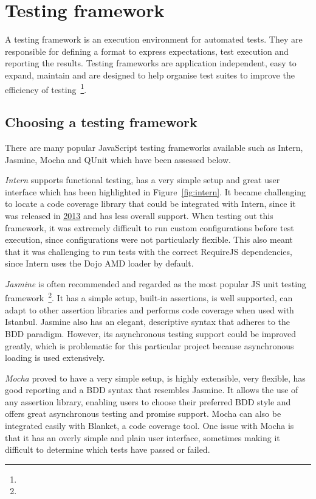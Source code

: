 \section{Testing framework} {
\label{sec:testing_framework}

	A testing framework is an execution environment for automated tests. They are responsible for defining a format to express expectations, test execution and reporting the results. Testing frameworks are application independent, easy to expand, maintain and are designed to help organise test suites to improve the efficiency of testing~\footnote{}.

	\subsection{Choosing a testing framework} {
	\label{sec:choosing_a_testing_framework}

		There are many popular JavaScript testing frameworks available such as Intern, Jasmine, Mocha and QUnit which have been assessed below.

		\emph{Intern} supports functional testing, has a very simple setup and great user interface which has been highlighted in Figure~\ref{fig:intern}. It became challenging to locate a code coverage library that could be integrated with Intern, since it was released in \href{https://github.com/theintern}{2013} and has less overall support. When testing out this framework, it was extremely difficult to run custom configurations before test execution, since configurations were not particularly flexible. This also meant that it was challenging to run tests with the correct RequireJS dependencies, since Intern uses the Dojo AMD loader by default.

		

		\emph{Jasmine} is often recommended and regarded as the most popular JS unit testing framework~\footnote{}. It has a simple setup, built-in assertions, is well supported, can adapt to other assertion libraries and performs code coverage when used with Istanbul. Jasmine also has an elegant, descriptive syntax that adheres to the BDD paradigm. However, its asynchronous testing support could be improved greatly, which is problematic for this particular project because asynchronous loading is used extensively.

		\emph{Mocha} proved to have a very simple setup, is highly extensible, very flexible, has good reporting and a BDD syntax that resembles Jasmine. It allows the use of any assertion library, enabling users to choose their preferred BDD style and offers great asynchronous testing and promise support. Mocha can also be integrated easily with Blanket, a code coverage tool. One issue with Mocha is that it has an overly simple and plain user interface, sometimes making it difficult to determine which tests have passed or failed.

}}
